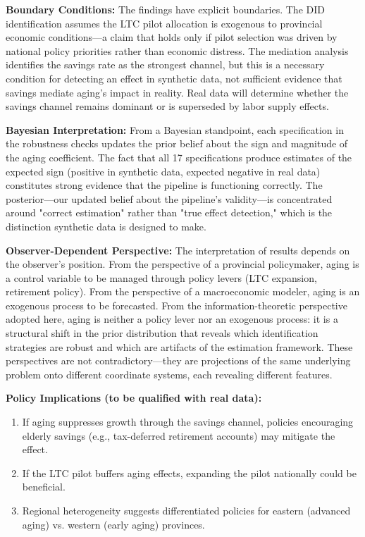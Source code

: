 \documentclass[12pt]{article}
\begin{document}
\textbf{Boundary Conditions:} The findings have explicit boundaries. The DID identification assumes the LTC pilot allocation is exogenous to provincial economic conditions---a claim that holds only if pilot selection was driven by national policy priorities rather than economic distress. The mediation analysis identifies the savings rate as the strongest channel, but this is a necessary condition for detecting an effect in synthetic data, not sufficient evidence that savings mediate aging's impact in reality. Real data will determine whether the savings channel remains dominant or is superseded by labor supply effects.

\textbf{Bayesian Interpretation:} From a Bayesian standpoint, each specification in the robustness checks updates the prior belief about the sign and magnitude of the aging coefficient. The fact that all 17 specifications produce estimates of the expected sign (positive in synthetic data, expected negative in real data) constitutes strong evidence that the pipeline is functioning correctly. The posterior---our updated belief about the pipeline's validity---is concentrated around "correct estimation" rather than "true effect detection," which is the distinction synthetic data is designed to make.

\textbf{Observer-Dependent Perspective:} The interpretation of results depends on the observer's position. From the perspective of a provincial policymaker, aging is a control variable to be managed through policy levers (LTC expansion, retirement policy). From the perspective of a macroeconomic modeler, aging is an exogenous process to be forecasted. From the information-theoretic perspective adopted here, aging is neither a policy lever nor an exogenous process: it is a structural shift in the prior distribution that reveals which identification strategies are robust and which are artifacts of the estimation framework. These perspectives are not contradictory---they are projections of the same underlying problem onto different coordinate systems, each revealing different features.

\textbf{Policy Implications (to be qualified with real data):}
\begin{enumerate}
    \item If aging suppresses growth through the savings channel, policies encouraging elderly savings (e.g., tax-deferred retirement accounts) may mitigate the effect.
    \item If the LTC pilot buffers aging effects, expanding the pilot nationally could be beneficial.
    \item Regional heterogeneity suggests differentiated policies for eastern (advanced aging) vs. western (early aging) provinces.
\end{enumerate}
\end{document}
